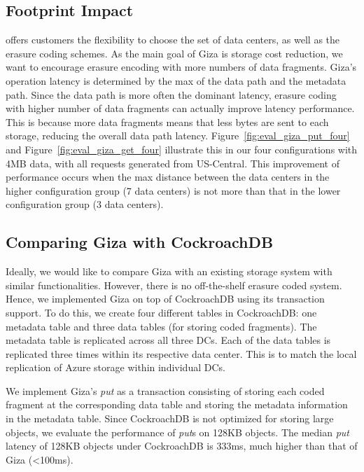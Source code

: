 \subsection{Footprint Impact}



\name offers customers the flexibility to choose the set of data centers, as well as the erasure coding schemes. As the main goal of Giza is storage cost reduction, we want to encourage erasure encoding with more numbers of data fragments. Giza’s operation latency is determined by the max of the data path and the metadata path.  Since the data path is more often the dominant latency, erasure coding with higher number of data fragments can actually improve latency performance. This is because more data fragments means that less bytes are sent to each storage, reducing the overall data path latency. Figure~\ref{fig:eval_giza_put_four} and  Figure~\ref{fig:eval_giza_get_four} illustrate this in our four configurations with 4MB data, with all requests generated from US-Central. This improvement of performance occurs when the max distance between the data centers in the higher configuration group (7 data centers) is not more than that in the lower configuration group (3 data centers).


\subsection{Comparing Giza with CockroachDB}

Ideally, we would like to compare Giza with an existing storage system with
similar functionalities.  However, there is no off-the-shelf erasure coded
system.  Hence, we implemented Giza on top of CockroachDB using its transaction support.
To do this, we create four different tables in CockroachDB: one metadata table
and three data tables (for storing coded fragments). The metadata table is
replicated across all three DCs. Each of the data tables is replicated three
times within its respective data center.  This is to match the local
replication of Azure storage within individual DCs.  

We implement Giza's {\em put} as a transaction consisting of storing each coded
fragment at the corresponding data table and storing the metadata information
in the metadata table. Since CockroachDB is not optimized for storing large
objects, we evaluate the performance of {\em put}s on 128KB objects.  The
median {\em put} latency of 128KB objects under CockroachDB is 333ms, much
higher than that of Giza (<100ms).  

